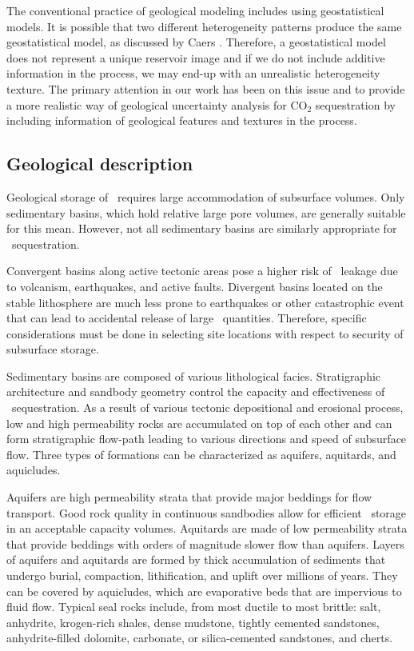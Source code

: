 The conventional practice of geological modeling includes using geostatistical
models. It is possible that two different heterogeneity patterns produce the
same geostatistical model, as discussed by Caers \cite{caers2002multiple}.
Therefore, a geostatistical model does not represent a unique reservoir image
and if we do not include additive information in the process, we may end-up
with an unrealistic heterogeneity
texture\cite{caers2002multiple,eaton2006importance}. The primary  attention in
our work has been on this issue and to provide a more realistic way of
geological uncertainty analysis for $\mbox{CO}_2$ sequestration by including
information of geological features and textures in the process. 


\subsection{Geological description}

Geological storage of \coo\ requires large accommodation of subsurface volumes. Only sedimentary basins, which hold relative large pore volumes, are generally suitable for this mean. However, not all sedimentary basins are similarly appropriate for \coo\ sequestration.

Convergent basins along active tectonic areas pose a higher risk of \coo\ leakage due to volcanism, earthquakes, and active faults. Divergent basins located on the stable lithosphere are much less prone to earthquakes or other catastrophic event that can lead to accidental release of large \coo\ quantities. Therefore, specific considerations must be done in selecting site locations with respect to security of subsurface storage.

Sedimentary basins are composed of various lithological facies. Stratigraphic architecture and sandbody geometry control the capacity and effectiveness of \coo\ sequestration. As a result of various tectonic depositional and erosional process, low and high permeability rocks are accumulated on top of each other and can form stratigraphic flow-path leading to various directions and speed of subsurface flow. Three types of formations can be characterized as aquifers, aquitards, and aquicludes. 

Aquifers are high permeability strata that provide major beddings for flow transport. Good rock quality in continuous sandbodies allow for efficient \coo\ storage in an acceptable capacity volumes. Aquitards are made of low permeability strata that provide beddings with orders of magnitude slower flow than aquifers. Layers of aquifers and aquitards are formed by thick accumulation of sediments that undergo burial, compaction, lithification, and uplift over millions of years. They can be covered by aquicludes, which are evaporative beds that are impervious to fluid flow. Typical seal rocks include, from most ductile to most brittle: salt, anhydrite, krogen-rich shales, dense mudstone, tightly cemented sandstones, anhydrite-filled dolomite, carbonate, or silica-cemented sandstones, and cherts.

